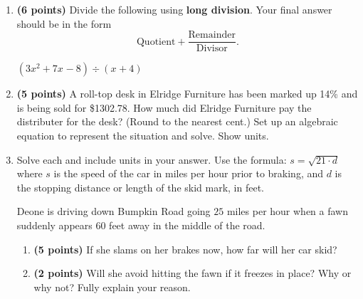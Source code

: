 \documentclass[12pt]{amsart}
\begin{document}
\begin{enumerate}
  
\vfill \vfill \vfill
\def \a{4}\def \b{3}\def \c{-5}\def \r{12}\def \monicpol{x^{}+4}\def \longnbad{3x^{2}+7x^{}-8}\def \anspol{3x^{}-5}
\item {\bf (6 points)} 
 Divide the following using {\bf long division}. Your final answer should be in the form $$ \text{Quotient} + \dfrac{\text{Remainder}}{\text{Divisor}}.$$

\vspace{3mm}

$(\longnbad) \div (\monicpol)$

\vfill  \vfill \vfill
\newpage\def \discount{14}\def \paid{1302.78}\def \rainy{11.75}\def \orcost{1514.86}\def \purcost{1142.79}\def \orrainy{13.66}
\item {\bf (5 points)} 
 A roll-top desk in Elridge Furniture has been marked up \discount\% and is being sold for \$\paid. How much did Elridge Furniture pay the distributer for the desk? (Round to the nearest cent.) Set up an algebraic equation to represent the situation and solve. Show units.

\vfill 
\def \insvar{21}\def \d{60}\def \zerospeed{35.5}\def \slimit{25}\def \s{46}\def \skidd{100.762}\def \safed{29.762}\def \rsafed{29}

 
\item Solve each and include units in your answer. Use the formula: $s = \sqrt{\insvar \cdot d}$ where $s$ is the speed of the car in miles per hour prior to braking, and $d$ is the stopping distance or length of the skid mark, in feet. 

\vspace{3mm}

Deone is driving down Bumpkin Road going $\slimit$ miles per hour when a fawn suddenly appears $\d$ feet away in the middle of the road. \begin{enumerate}
\item {\bf (5 points)} If she slams on her brakes now, how far will her car skid? \vspace{4cm}
\item {\bf (2 points)} Will she avoid hitting the fawn if it freezes in place? Why or why not? Fully explain your reason. \vspace{3cm}
\end{enumerate}



\end{enumerate}
\end{document}
